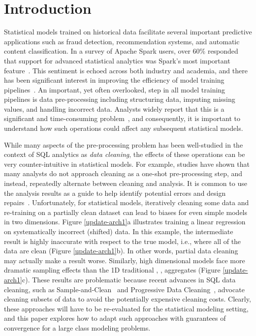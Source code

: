 \section{Introduction}
Statistical models trained on historical data facilitate several important predictive applications such as fraud detection, recommendation systems, and automatic content classification.
In a survey of Apache Spark users, over 60\% responded that support for advanced statistical analytics was Spark's most important feature~\cite{sparksurvey}.
This sentiment is echoed across both industry and academia, and there has been significant interest in improving the efficiency of model training pipelines~\cite{bdas, alexandrov2014stratosphere, crotty2014tupleware, tensor}. 
An important, yet often overlooked, step in all model training pipelines is data pre-processing including structuring data, imputing missing values, and handling incorrect data.
Analysts widely report that this is a significant and time-consuming problem~\cite{kandel2012,nytimes}, and consequently, it is important to understand how such operations could affect any subsequent statistical models.

While many aspects of the pre-processing problem has been well-studied in the context of SQL analytics as \emph{data cleaning}, the effects of these operations can be very counter-intuitive in statistical models.
For example, studies have shown that many analysts do not approach cleaning as a one-shot pre-processing step, and instead, repeatedly alternate between cleaning and analysis.
It is common to use the analysis results as a guide to help identify potential errors and design repairs~\cite{kandel2012}.
Unfortunately, for statistical models, iteratively cleaning some data and re-training on a partially clean dataset can lead to biases for even simple models in two dimensions.
Figure \ref{update-arch1}a illustrates training a linear regression on systematically incorrect (shifted) data.
In this example, the intermediate result is highly inaccurate with respect to the true model, i.e., where all of the data are clean (Figure \ref{update-arch1}b).
In other words, partial data cleaning may actually make a result worse.
Similarly, high dimensional models face more dramatic sampling effects than the 1D traditional \sumfunc, \countfunc, \avgfunc aggregates (Figure \ref{update-arch1}c).
These results are problematic because recent advances in SQL data cleaning, such as Sample-and-Clean~\cite{wang1999sample} and Progressive Data Cleaning~\cite{altowim2014progressive, papenbrock2015progressive, DBLP:journals/pvldb/YakoutENOI11}, advocate cleaning subsets of data to avoid the potentially expensive cleaning costs.
Clearly, these approaches will have to be re-evaluated for the statistical modeling setting, and this paper explores how to adapt such approaches with guarantees of convergence for a large class modeling problems. 

